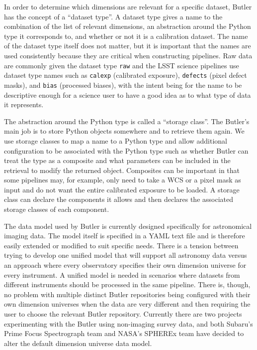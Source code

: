 \documentclass[]{spie}
\begin{document}
In order to determine which dimensions are relevant for a specific dataset, Butler has the concept of a ``dataset type''.
A dataset type gives a name to the combination of the list of relevant dimensions, an abstraction around the Python type it corresponds to, and whether or not it is a calibration dataset.
The name of the dataset type itself does not matter, but it is important that the names are used consistently because they are critical when constructing pipelines.
Raw data are commonly given the dataset type \texttt{raw} and the LSST science pipelines use dataset type names such as \texttt{calexp} (calibrated exposure), \texttt{defects} (pixel defect masks), and \texttt{bias} (processed biases), with the intent being for the name to be descriptive enough for a science user to have a good idea as to what type of data it represents.

The abstraction around the Python type is called a ``storage class''.
The Butler's main job is to store Python objects somewhere and to retrieve them again.
We use storage classes to map a name to a Python type and allow additional configuration to be associated with the Python type such as whether Butler can treat the type as a composite and what parameters can be included in the retrieval to modify the returned object.
Composites can be important in that some pipelines may, for example, only need to take a WCS or a pixel mask as input and do not want the entire calibrated exposure to be loaded.
A storage class can declare the components it allows and then declares the associated storage classes of each component.

The data model used by Butler is currently designed specifically for astronomical imaging data.
The model itself is specified in a YAML text file and is therefore easily extended or modified to suit specific needs.
There is a tension between trying to develop one unified model that will support all astronomy data versus an approach where every observatory specifies their own dimension universe for every instrument.
A unified model is needed in scenarios where datasets from different instruments should be processed in the same pipeline.
There is, though, no problem with multiple distinct Butler repositories being configured with their own dimension universes when the data are very different and then requiring the user to choose the relevant Butler repository.
Currently there are two projects experimenting with the Butler using non-imaging survey data, and both Subaru's Prime Focus Spectrograph team\cite{2020SPIE11447E..7VW} and NASA's SPHEREx team\cite{2020SPIE11443E..0IC} have decided to alter the default dimension universe data model.
\end{document}
